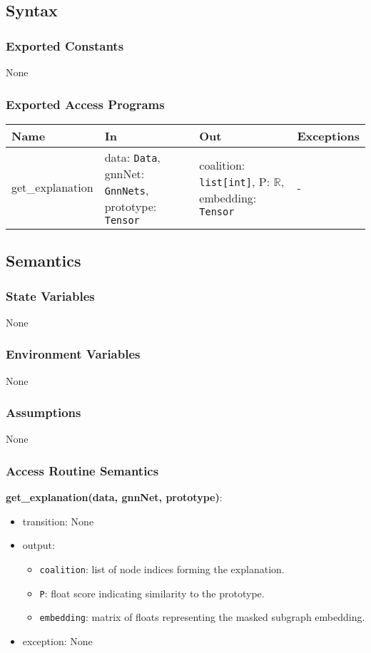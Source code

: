\documentclass[12pt, titlepage]{article}
\begin{document}
\subsection{Syntax}

\subsubsection{Exported Constants}
None

\subsubsection{Exported Access Programs}

\begin{center}
\begin{tabular}{p{3cm} p{5cm} p{4.5cm} p{3cm}}
\hline
\textbf{Name} & \textbf{In} & \textbf{Out} & \textbf{Exceptions} \\
\hline
get\_explanation & data: \texttt{Data}, gnnNet: \texttt{GnnNets}, prototype: \texttt{Tensor} & coalition: \texttt{list[int]}, P: \(\mathbb{R}\), embedding: \texttt{Tensor} & - \\
\hline
\end{tabular}
\end{center}

\subsection{Semantics}

\subsubsection{State Variables}
None

\subsubsection{Environment Variables}
None

\subsubsection{Assumptions}
None

\subsubsection{Access Routine Semantics}

\noindent \textbf{get\_explanation(data, gnnNet, prototype)}:
\begin{itemize}
  \item transition: None
  \item output:
  \begin{itemize}
    \item \texttt{coalition}: list of node indices forming the explanation.
    \item \texttt{P}: float score indicating similarity to the prototype.
    \item \texttt{embedding}: matrix of floats representing the masked subgraph embedding.
  \end{itemize}
  \item exception: None
\end{itemize}
\end{document}

